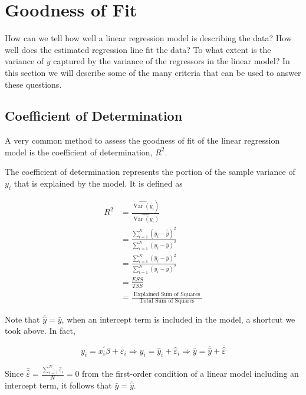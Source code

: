 \section{Goodness of Fit}
How can we tell how well a linear regression model is describing the data? How well does the estimated regression line fit the data? To what extent is the variance of $y$ captured by the variance of the regressors in the linear model? In this section we will describe some of the many criteria that can be used to answer these questions.

\subsection{Coefficient of Determination}
A very common method to assess the goodness of fit of the linear regression model is the coefficient of determination, $R^{2}$.
\begin{definition}
    The coefficient of determination represents the portion of the sample variance of $y_{i}$ that is explained by the model. It is defined as
    
    $$
    \begin{aligned}
    R^{2} & =\frac{\left.\widehat{\operatorname{Var}\left(\widehat{y}_{i}\right.}\right)}{\widehat{\operatorname{Var}\left(y_{i}\right)}} \\
    & =\frac{\sum_{i=1}^{N}\left(\widehat{y}_{i}-\overline{\widehat{y}}\right)^{2}}{\sum_{i=1}^{N}\left(y_{i}-\bar{y}\right)^{2}} \\
    & =\frac{\sum_{i=1}^{N}\left(\widehat{y}_{i}-\bar{y}\right)^{2}}{\sum_{i=1}^{N}\left(y_{i}-\bar{y}\right)^{2}} \\
    & =\frac{E S S}{T S S} \\
    & =\frac{\text { Explained Sum of Squares }}{\text { Total Sum of Squares }}
    \end{aligned}
    $$
\end{definition}

Note that $\overline{\widehat{y}}=\bar{y}$, when an intercept term is included in the model, a shortcut we took above. In fact,

$$
y_{i}=x_{i}^{\prime} \beta+\varepsilon_{i} \Longrightarrow y_{i}=\widehat{y}_{i}+\widehat{\varepsilon}_{i} \Longrightarrow \bar{y}=\overline{\widehat{y}}+\overline{\widehat{\varepsilon}}
$$

Since $\widehat{\widehat{\varepsilon}}=\frac{\sum_{i=1}^{N} \widehat{\varepsilon}_{i}}{N}=0$ from the first-order condition of a linear model including an intercept term, it follows that $\bar{y}=\overline{\widehat{y}}$.

